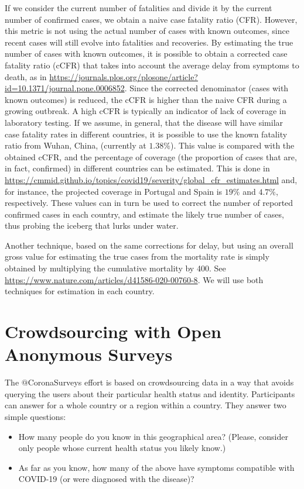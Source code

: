 \documentclass{article}
\begin{document}
If we consider the current number of fatalities and divide it by the current number of confirmed cases, we obtain a naive case fatality ratio (CFR). However, this metric is not using the actual number of cases with known outcomes, since recent cases will still evolve into fatalities and recoveries. By estimating the true number of cases with known outcomes, it is possible to obtain a corrected case fatality ratio (cCFR) that takes into account the average delay from symptoms to death, as in \url{https://journals.plos.org/plosone/article?id=10.1371/journal.pone.0006852}.
Since the corrected denominator (cases with known outcomes) is reduced, the cCFR is higher than the naive CFR during a growing outbreak. A high cCFR is typically an indicator of lack of coverage in laboratory testing. If we assume, in general, that the disease will have similar case fatality rates in different countries, it is possible to use the known fatality ratio from Wuhan, China, (currently at $1.38\%$). This value is compared with the obtained cCFR, and the percentage of coverage (the proportion of cases that are, in fact, confirmed) in different countries can be estimated. This is done in \url{https://cmmid.github.io/topics/covid19/severity/global_cfr_estimates.html} and, for instance, the projected coverage in Portugal and Spain is $19\%$ and $4.7\%$, respectively. These values can in turn be used to correct the number of reported confirmed cases in each country, and estimate the likely true number of cases, thus probing the iceberg that lurks under water.

Another technique, based on the same corrections for delay, but using an overall gross value for estimating the true cases from the mortality rate is simply obtained by multiplying the cumulative mortality by 400. See \url{https://www.nature.com/articles/d41586-020-00760-8}. We will use both techniques for estimation in each country.

\section{Crowdsourcing with Open Anonymous Surveys}

The $@$CoronaSurveys effort is based on crowdsourcing data in a way that avoids querying the users about their particular health status and identity. Participants can answer for a whole country or a region within a country. They answer two simple questions: 

\begin{itemize}
\item How many people do you know in this geographical area? (Please, consider only people whose current health status you likely know.)
\item As far as you know, how many of the above have symptoms compatible with COVID-19 (or were diagnosed with the disease)?
\end{itemize}
\end{document}
